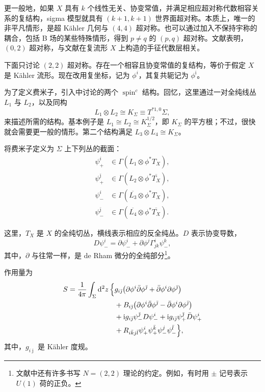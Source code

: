 更一般地，如果 $X$ 具有 $k$ 个线性无关、协变常值，并满足相应超对称代数相容关系的复结构，sigma 模型就具有 $(k+1,k+1)$ 世界面超对称。本质上，唯一的非平凡情形，是超 K\"ahler 几何与 $(4,4)$ 超对称。也可以通过加入不保持宇称的耦合，包括 B 场的某些特殊情形，得到 $p\ne q$ 的 $(p,q)$ 超对称。文献表明，$(0,2)$ 超对称，与文献在复流形 $X$ 上构造的手征代数层相关。

下面只讨论 $(2,2)$ 超对称。存在一个相容且协变常值的复结构，等价于假定 $X$ 是 K\"ahler 流形。现在改用复坐标，记为 $\phi^i$，其复共轭记为 $\phi^{\bar\imath}$。

为了定义费米子，引入中讨论的两个 $\operatorname{spin}^c$ 结构。回忆，这里通过一对全纯线丛 $L_1$ 与 $L_2$，以及同构
\[
L_1\otimes L_2\cong K_\Sigma\equiv T^{*1,0}\Sigma,
\]
来描述所需的结构。基本例子是 $L_1\cong L_2\cong K_\Sigma^{1/2}$，即 $K_\Sigma$ 的平方根；不过，很快就会需要更一般的情形。第二个结构满足 $L_3\otimes L_4\cong K_\Sigma$。

\begin{definition*}\label{def:3.sigma-fermion-bundles}
将费米子定义为 $\Sigma$ 上下列丛的截面：
\begin{equation}\label{eq:3.85}
\begin{aligned}
\psi_+^i&\in\Gamma(L_1\otimes\phi^*T_X),\\
\psi_+^{\bar\jmath}&\in\Gamma(L_2\otimes\phi^*\overline{T_X}),\\
\psi_-^i&\in\Gamma(\overline{L_3}\otimes\phi^*T_X),\\
\psi_-^{\bar\jmath}&\in\Gamma(\overline{L_4}\otimes\phi^*\overline{T_X}).
\end{aligned}
\end{equation}
\end{definition*}
这里，$T_X$ 是 $X$ 的全纯切丛，横线表示相应的反全纯丛。$D$ 表示协变导数，
\[
D\psi_-^i=\partial\psi_-^i+
\partial\phi^j\Gamma^i_{jk}\psi_-^k,
\]
其中，$\partial$ 与往常一样，是 de Rham 微分的全纯部分\footnote{文献中还有许多书写 $N=(2,2)$ 理论的约定。例如，有时用 $\pm$ 记号表示 $U(1)$ 荷的正负。}。

作用量为
\begin{equation}\label{eq:3.86}
\begin{aligned}
S=\frac1{4\pi}\int_\Sigma\mathrm{d}^2z\,
\Bigl\{&g_{i\bar\jmath}
\bigl(\partial\phi^i\bar\partial\phi^{\bar\jmath}
+\bar\partial\phi^i\partial\phi^{\bar\jmath}\bigr)\\
&+B_{i\bar\jmath}
\bigl(\partial\phi^i\bar\partial\phi^{\bar\jmath}
-\bar\partial\phi^i\partial\phi^{\bar\jmath}\bigr)\\
&+\mathrm{i}g_{i\bar\jmath}\psi_-^{\bar\jmath}D\psi_-^i
+\mathrm{i}g_{i\bar\jmath}\psi_+^{\bar\jmath}\bar D\psi_+^i\\
&+R_{i\bar k j\bar l}\psi_+^i\psi_+^{\bar k}
\psi_-^j\psi_-^{\bar l}\Bigr\},
\end{aligned}
\end{equation}
其中，$g_{i\bar\jmath}$ 是 K\"ahler 度规。

